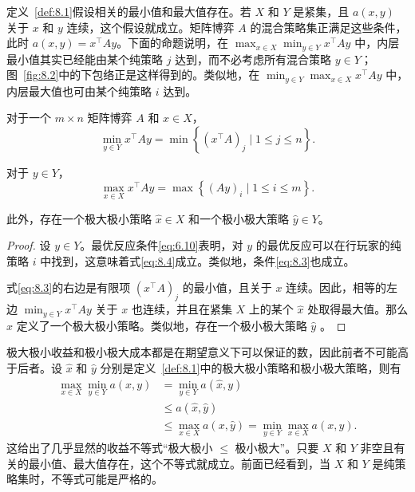 定义~\ref{def:8.1}假设相关的最小值和最大值存在。若 \(X\) 和 \(Y\) 是紧集，且 \(a\left( {x,y}\right)\) 关于 \(x\) 和 \(y\) 连续，这个假设就成立。矩阵博弈 \(A\) 的混合策略集正满足这些条件，此时 \(a\left( {x,y}\right)  = {x}^{\top }{Ay}\)。下面的命题说明，在 \(\max_{{x \in  X}}\min_{{y \in  Y}}{x}^{\top }{Ay}\) 中，内层最小值其实已经能由某个纯策略 \(j\) 达到，而不必考虑所有混合策略 \(y\in Y\)；图~\ref{fig:8.2}中的下包络正是这样得到的。类似地，在 \(\min_{{y \in  Y}}\max_{{x \in  X}}{x}^{\top }{Ay}\) 中，内层最大值也可由某个纯策略 \(i\) 达到。


\begin{proposition}\label{prop:8.2}
     对于一个 \(m \times  n\) 矩阵博弈 \(A\) 和 \(x \in  X\)，
\begin{equation}\label{eq:8.3}
    \min_{{y \in  Y}}{x}^{\top }{Ay} = \min \left\{  {{\left( {x}^{\top }A\right) }_{j} \mid  1 \leq  j \leq  n}\right\}.
\end{equation}


对于 \(y \in  Y\)，
\begin{equation}\label{eq:8.4}
    \max_{{x \in  X}}{x}^{\top }{Ay} = \max \left\{  {{\left( Ay\right) }_{i} \mid  1 \leq  i \leq  m}\right\}.
\end{equation}


此外，存在一个极大极小策略 \(\widehat{x} \in  X\) 和一个极小极大策略 \(\widehat{y} \in  Y\)。
\end{proposition}
\begin{proof}
设 \(y \in  Y\)。最优反应条件\eqref{eq:6.10}表明，对 \(y\) 的最优反应可以在行玩家的纯策略 \(i\) 中找到，这意味着式\eqref{eq:8.4}成立。类似地，条件\eqref{eq:8.3}也成立。

式\eqref{eq:8.3}的右边是有限项 \({\left( {x}^{\top }A\right) }_{j}\) 的最小值，且关于 \(x\) 连续。因此，相等的左边 \(\min_{{y \in  Y}}{x}^{\top }{Ay}\) 关于 \(x\) 也连续，并且在紧集 \(X\) 上的某个 \(\widehat{x}\) 处取得最大值。那么 \(\widehat{x}\) 定义了一个极大极小策略。类似地，存在一个极小极大策略 \(\widehat{y}\) 。
\end{proof}

极大极小收益和极小极大成本都是在期望意义下可以保证的数，因此前者不可能高于后者。设 \(\widehat{x}\) 和 \(\widehat{y}\) 分别是定义~\ref{def:8.1}中的极大极小策略和极小极大策略，则有
\begin{equation}\label{eq:8.5}
\begin{aligned}
\max_{{x \in  X}}\min_{{y \in  Y}}a\left( {x,y}\right)  &= \min_{{y \in  Y}}a\left( {\widehat{x},y}\right)\\
&\leq  a\left( {\widehat{x},\widehat{y}}\right)\\
&\leq \max_{{x \in  X}}a\left( {x,\widehat{y}}\right)  = \min_{{y \in  Y}}\max_{{x \in  X}}a\left( {x,y}\right).
\end{aligned}
\end{equation}
这给出了几乎显然的收益不等式“极大极小 \(\leq\) 极小极大”。只要 \(X\) 和 \(Y\) 非空且有关的最小值、最大值存在，这个不等式就成立。前面已经看到，当 \(X\) 和 \(Y\) 是纯策略集时，不等式可能是严格的。

